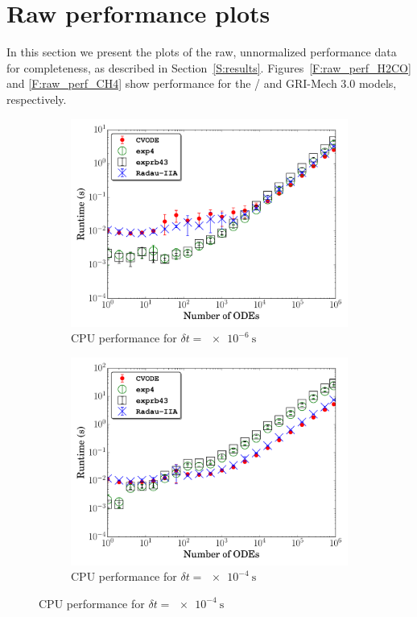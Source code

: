 \documentclass[preprint,review,11pt]{elsarticle}
\begin{document}
\section{Raw performance plots}
\label{S:raw}

In this section we present the plots of the raw, unnormalized performance data for completeness, as described in Section~\ref{S:results}.
Figures~\ref{F:raw_perf_H2CO} and \ref{F:raw_perf_CH4} show performance for the \slash{} and GRI-Mech 3.0 models, respectively.

\begin{figure}[htb]
  \centering
  \begin{subfigure}{0.49\textwidth}
      \includegraphics[width=\linewidth]{H2_1e-06_cpu_nonorm.pdf}
      \caption{CPU performance for $\delta t = \SI{e-6}{\second}$}
  \end{subfigure}
  \begin{subfigure}{0.49\textwidth}
      \includegraphics[width=\linewidth]{H2_1e-04_cpu_nonorm.pdf}
      \caption{CPU performance for $\delta t = \SI{e-4}{\second}$}
 

\end{subfigure}
\end{figure}
\end{document}
